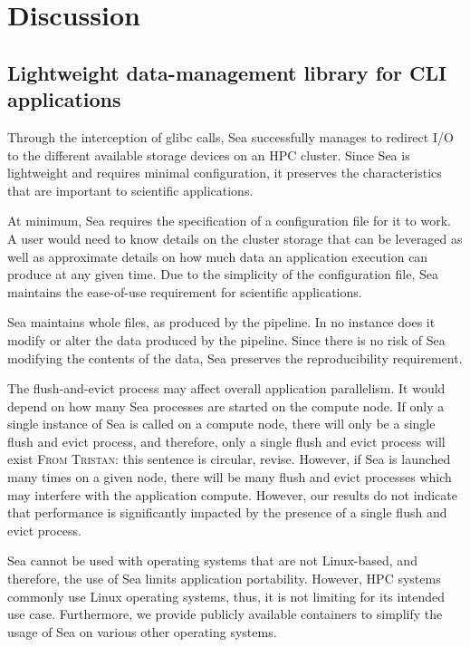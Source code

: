 \documentclass[10pt,journal,compsoc]{IEEEtran}
\newcommand{\TG}[1]{\color{red}\textsc{From Tristan}: #1\xspace\color{black}}
\begin{document}
\section{Discussion}

    \subsection{Lightweight data-management library for CLI applications}

    Through the interception of glibc calls, Sea successfully manages to
    redirect I/O to the different available storage devices on an HPC cluster.
    Since Sea is lightweight and requires minimal configuration, it preserves
    the characteristics that are important to scientific applications.

    At minimum, Sea requires the specification of a configuration file for it to
    work. A user would need to know details on the cluster storage that can be
    leveraged as well as approximate details on how much data an application
    execution can produce at any given time. Due to the simplicity of the
    configuration file, Sea maintains the ease-of-use requirement for scientific
    applications.

    Sea maintains whole files, as produced by the pipeline. In no instance does
    it modify or alter the data produced by the pipeline. Since there is no risk
    of Sea modifying the contents of the data, Sea preserves the reproducibility
    requirement.

    The flush-and-evict process may affect overall application parallelism. It
    would depend on how many Sea processes are started on the compute node. If
    only a single instance of Sea is called on a compute node, there will only
    be a single flush and evict process, and therefore, only a single flush and
    evict process will exist \TG{this sentence is circular, revise}. However, if Sea is launched many times on a given
    node, there will be many flush and evict processes which may interfere with
    the application compute. However, our results do not indicate that
    performance is significantly impacted by the presence of a single flush and
    evict process.  

    Sea cannot be used with operating systems that are not Linux-based, and
    therefore, the use of Sea limits application portability. However, HPC
    systems commonly use Linux operating systems, thus, it is not limiting for
    its intended use case. Furthermore, we provide publicly available containers
    to simplify the usage of Sea on various other operating systems.
\end{document}
